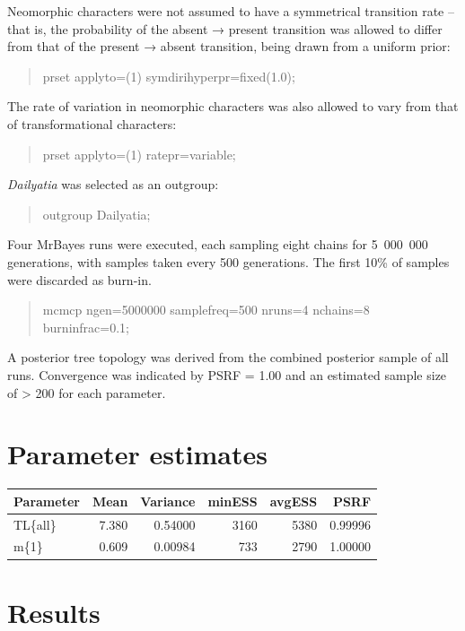 \documentclass[openany]{book}
\theoremstyle{definition}
\theoremstyle{definition}
\theoremstyle{definition}
\theoremstyle{remark}
\begin{document}
Neomorphic characters were not assumed to have a symmetrical transition
rate -- that is, the probability of the absent → present transition was
allowed to differ from that of the present → absent transition, being
drawn from a uniform prior:

\begin{quote}
prset applyto=(1) symdirihyperpr=fixed(1.0);
\end{quote}

The rate of variation in neomorphic characters was also allowed to vary
from that of transformational characters:

\begin{quote}
prset applyto=(1) ratepr=variable;
\end{quote}

\emph{Dailyatia} was selected as an outgroup:

\begin{quote}
outgroup Dailyatia;
\end{quote}

Four MrBayes runs were executed, each sampling eight chains for
5~000~000 generations, with samples taken every 500 generations. The
first 10\% of samples were discarded as burn-in.

\begin{quote}
mcmcp ngen=5000000 samplefreq=500 nruns=4 nchains=8 burninfrac=0.1;
\end{quote}

A posterior tree topology was derived from the combined posterior sample
of all runs. Convergence was indicated by PSRF = 1.00 and an estimated
sample size of \textgreater{} 200 for each parameter.

\section{Parameter estimates}\label{parameter-estimates}

\begin{tabular}{l|r|r|r|r|r}
\hline
Parameter & Mean & Variance & minESS & avgESS & PSRF\\
\hline
TL\{all\} & 7.380 & 0.54000 & 3160 & 5380 & 0.99996\\
\hline
m\{1\} & 0.609 & 0.00984 & 733 & 2790 & 1.00000\\
\hline
\end{tabular}

\section{Results}\label{results-2}
\end{document}
